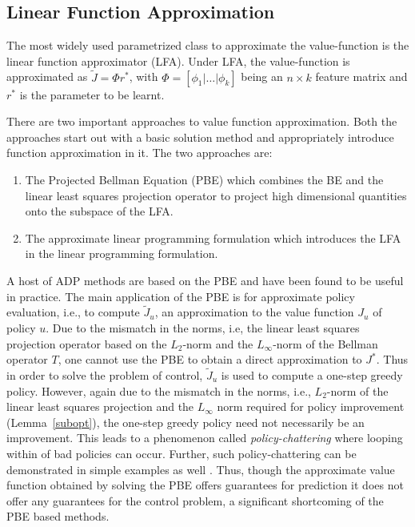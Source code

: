 \subsection{Linear Function Approximation}
The most widely used parametrized class to approximate the value-function is the linear function approximator (LFA). Under LFA, the value-function is approximated as $\tilde{J}=\Phi r^*$, with $\Phi=[\phi_1|\ldots|\phi_k]$ being an $n\times k$ feature matrix and $r^*$ is the parameter to be learnt.

There are two important approaches to value function approximation. Both the approaches start out with a basic solution method and appropriately introduce function approximation in it. The two approaches are:
\begin{enumerate}
\item The Projected Bellman Equation (PBE) which combines the BE and the linear least squares projection operator to project high dimensional quantities onto the subspace of the LFA.
\item The approximate linear programming formulation which introduces the LFA in the linear programming formulation. 
\end{enumerate}
A host of ADP methods are based on the PBE and have been found to be useful in practice. The main application of the PBE is for approximate policy evaluation, i.e., to compute $\tilde{J}_u$, an approximation to the value function $J_u$ of policy $u$. Due to the mismatch in the norms, i.e, the linear least squares projection operator based on the $L_2$-norm and the $L_\infty$-norm of the Bellman operator $T$, one cannot use the PBE to obtain a direct approximation to $J^*$. Thus in order to solve the problem of control, $\tilde{J}_u$ is used to compute a one-step greedy policy. However, again due to the mismatch in the norms, i.e., $L_2$-norm of the linear least squares projection and the $L_\infty$ norm required for policy improvement (Lemma~\ref{subopt}), the one-step greedy policy need not necessarily be an improvement. This leads to a phenomenon called \emph{policy-chattering} \cite{dpchapter} where looping within of bad policies can occur. Further, such policy-chattering can be demonstrated in simple examples as well \cite{dpchapter}. Thus, though the approximate value function obtained by solving the PBE offers guarantees for prediction it does not offer any guarantees for the control problem, a significant shortcoming of the PBE based methods.

